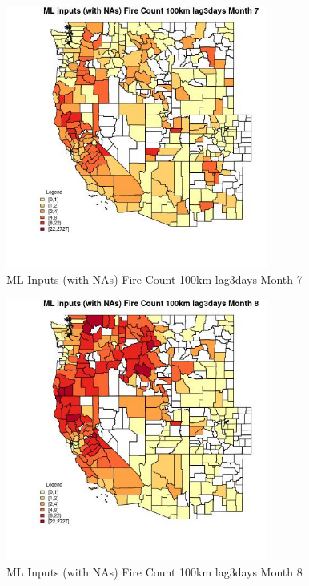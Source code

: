 \begin{figure} 
\centering  
\includegraphics[width=0.77\textwidth]{Code_Outputs/Report_ML_input_PM25_Step4_part_f_de_duplicated_aveswNAs_CountyFire_Count_100km_lag3daysmedianMonth7.jpg} 
\caption{\label{fig:Report_ML_input_PM25_Step4_part_f_de_duplicated_aveswNAsCountyFire_Count_100km_lag3daysmedianMonth7}ML Inputs (with NAs) Fire Count 100km lag3days Month 7} 
\end{figure} 
 

\begin{figure} 
\centering  
\includegraphics[width=0.77\textwidth]{Code_Outputs/Report_ML_input_PM25_Step4_part_f_de_duplicated_aveswNAs_CountyFire_Count_100km_lag3daysmedianMonth8.jpg} 
\caption{\label{fig:Report_ML_input_PM25_Step4_part_f_de_duplicated_aveswNAsCountyFire_Count_100km_lag3daysmedianMonth8}ML Inputs (with NAs) Fire Count 100km lag3days Month 8} 
\end{figure} 
 

